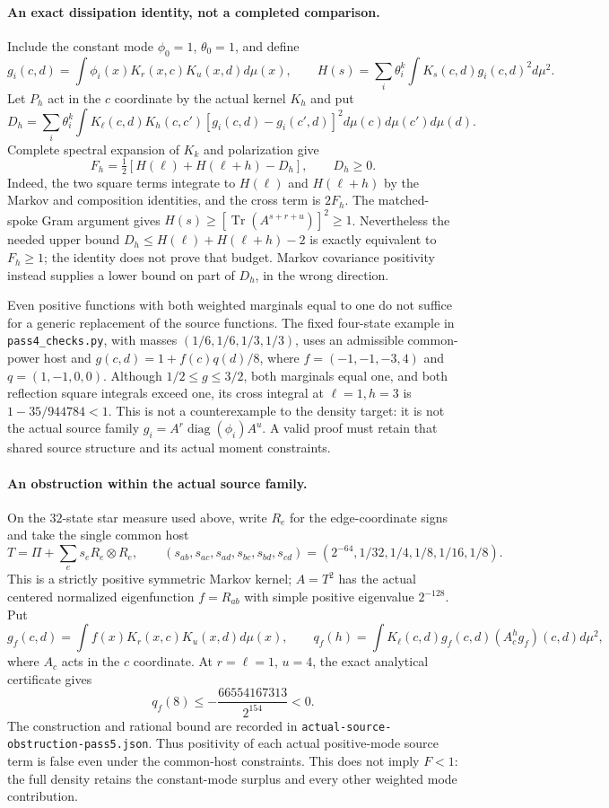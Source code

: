\paragraph{An exact dissipation identity, not a completed comparison.}
Include the constant mode $\phi_0=1$, $\theta_0=1$, and define
\[
 g_i(c,d)=\int\phi_i(x)K_r(x,c)K_u(x,d)d\mu(x),\qquad
 H(s)=\sum_i\theta_i^k\int K_s(c,d)g_i(c,d)^2d\mu^2.
\]
Let $P_h$ act in the $c$ coordinate by the actual kernel $K_h$ and put
\[
 D_h=\sum_i\theta_i^k\int K_\ell(c,d)K_h(c,c')
          [g_i(c,d)-g_i(c',d)]^2d\mu(c)d\mu(c')d\mu(d).
\]
Complete spectral expansion of $K_k$ and polarization give
\begin{equation}
 F_h=\tfrac12[H(\ell)+H(\ell+h)-D_h],\qquad D_h\geq0.
 \label{eq:actual-source-dissipation}
\end{equation}
Indeed, the two square terms integrate to $H(\ell)$ and $H(\ell+h)$
by the Markov and composition identities, and the cross term is $2F_h$.
The matched-spoke Gram argument gives
$H(s)\geq[\operatorname{Tr}(A^{s+r+u})]^2\geq1$.
Nevertheless the needed upper bound
$D_h\leq H(\ell)+H(\ell+h)-2$ is exactly equivalent to $F_h\geq1$;
the identity does not prove that budget.  Markov covariance positivity
instead supplies a lower bound on part of $D_h$, in the wrong direction.

Even positive functions with both weighted marginals equal to one do not
suffice for a generic replacement of the source functions.  The fixed
four-state example in \texttt{pass4\_checks.py}, with masses
$(1/6,1/6,1/3,1/3)$, uses an admissible common-power host and
$g(c,d)=1+f(c)q(d)/8$, where
$f=(-1,-1,-3,4)$ and $q=(1,-1,0,0)$.
Although $1/2\leq g\leq3/2$, both marginals equal one, and both
reflection square integrals exceed one, its cross integral at
$\ell=1,h=3$ is $1-35/944784<1$.
This is not a counterexample to the density target: it is not the actual
source family $g_i=A^r\operatorname{diag}(\phi_i)A^u$.
A valid proof must retain that shared source structure and its actual
moment constraints.

\paragraph{An obstruction within the actual source family.}
On the $32$-state star measure used above, write $R_e$ for the
edge-coordinate signs and take the single common host
\[
 T=\Pi+\sum_es_eR_e\otimes R_e,\qquad
 (s_{ab},s_{ac},s_{ad},s_{bc},s_{bd},s_{cd})
   =(2^{-64},1/32,1/4,1/8,1/16,1/8).
\]
This is a strictly positive symmetric Markov kernel; $A=T^2$ has the
actual centered normalized eigenfunction $f=R_{ab}$ with simple positive
eigenvalue $2^{-128}$.  Put
\[
 g_f(c,d)=\int f(x)K_r(x,c)K_u(x,d)d\mu(x),\qquad
 q_f(h)=\int K_\ell(c,d)g_f(c,d)(A_c^hg_f)(c,d)d\mu^2,
\]
where $A_c$ acts in the $c$ coordinate.  At $r=\ell=1$, $u=4$, the
exact analytical certificate gives
\[
 q_f(8)\leq-\frac{66554167313}{2^{154}}<0.
\]
The construction and rational bound are recorded in
\texttt{actual-source-obstruction-pass5.json}.  Thus positivity of each
actual positive-mode source term is false even under the common-host
constraints.  This does not imply $F<1$: the full density retains the
constant-mode surplus and every other weighted mode contribution.

